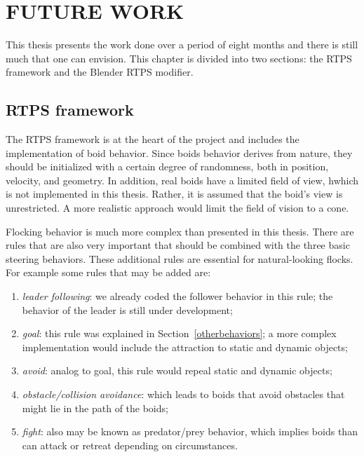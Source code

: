 \chapter{FUTURE WORK}\label{chap8}

This thesis presents the work done over a period of eight months and there is still much that one can envision. This chapter is  divided into two sections: the RTPS framework and the Blender RTPS modifier.

\section{RTPS framework}

The RTPS framework is at the heart of the project and includes the implementation of boid behavior. Since boids behavior derives from nature, they should be initialized with a certain degree of randomness, both in position, velocity, and geometry. In addition, real boids have a limited field of view, hwhich is not implemented in this thesis. Rather, it is assumed that the boid's view is unrestricted. 
A more realistic approach would limit the field of vision to a cone.  

Flocking behavior is much more complex than presented in this thesis. There are rules that are also very important that should be combined with the three basic steering behaviors. These additional rules are essential for natural-looking flocks. For example some rules that may be added are: 

\begin{enumerate}
\item{\textit{leader following}: we already coded the follower behavior in this rule; the behavior of the leader  is still under development;}
\item{\textit{goal}: this rule was explained in Section~\ref{otherbehaviors}; a more complex implementation would include the attraction to static and dynamic objects;}
\item{\textit{avoid}: analog to goal, this rule would repeal static and dynamic objects;} 
\item{\textit{obstacle/collision avoidance}: which leads to boids that avoid obstacles that might lie in the path of the boids;}
\item{\textit{fight}: also may be known as predator/prey behavior, which implies boids than can  attack or retreat depending on circumstances.}
\end{enumerate}

